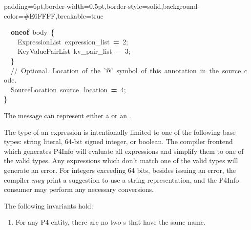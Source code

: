 \documentclass[11pt]{article}
\begin{document}
{\begin{mdbmargintb}{6pt}{6pt}
\begin{mdblock}{padding=6pt,border-width=0.5pt,border-style=solid,background-color=\#E6FFFF,breakable=true}
\begin{mdpre}
{{~~{\bfseries{oneof}}~body~\{\\
~~~~ExpressionList~expression\_list~{\bfseries{=}}~{2};\\
~~~~KeyValuePairList~kv\_pair\_list~{\bfseries{=}}~{3};\\
~~\}\\
~~{//~Optional.~Location~of~the~'@'~symbol~of~this~annotation~in~the~source~code.}\\
~~SourceLocation~source\_location~{\bfseries{=}}~{4};\\
\}}}%
\end{mdpre}%
\end{mdblock}%
\end{mdbmargintb}%

\noindent{}The  message can represent either a 
or an .%

The type of an expression is intentionally limited to one of the following
base types: string literal, 64-bit signed integer, or boolean. The 
compiler frontend which generates P4Info will evaluate all expressions and
simplify them to one of the valid types. Any expressions which don't match one
of the valid types will generate an error. For integers exceeding 64 bits,
besides issuing an error, the compiler \emph{may} print a suggestion to use a
string representation, and the P4Info consumer may perform any necessary
conversions.%

The following invariants hold:%

\begin{enumerate}%

\item{}
For any P4 entity, there are no two s that have the
same name.%


\end{enumerate}}
\end{document}

